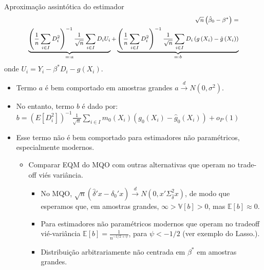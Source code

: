 \documentclass[11pt]{beamer}
\begin{document}
	\begin{frame}{Aproximação assintótica do estimador}
		\begin{equation*}
			\footnotesize 
			\begin{aligned}
						\sqrt{n}\left(\hat{\beta}_{0}-\beta^*\right)=\\ \underbrace{\left(\frac{1}{n} \sum_{i \in I} D_{i}^{2}\right)^{-1} \frac{1}{\sqrt{n}} \sum_{i \in I} D_{i} U_{i}}_{=:a}+\underbrace{\left(\frac{1}{n} \sum_{i \in I} D_{i}^{2}\right)^{-1} \frac{1}{\sqrt{n}} \sum_{i \in I} D_{i}\left(g\left(X_{i}\right)-\hat{g}\left(X_{i}\right)\right)}_{=:b}
			\end{aligned}
		\end{equation*}
						onde $U_i = Y_i - \beta^* D_i - g(X_i)$.

		\begin{itemize}
			\item Termo $a$ é bem comportado em amostras grandes $a\overset{d}{\to} N(0,\sigma^2)$.
			\item No entanto, termo $b$ é dado por:
			\(b=\left(E\left[D_{i}^{2}\right]\right)^{-1} \frac{1}{\sqrt{n}} \sum_{i \in I} m_{0}\left(X_{i}\right)\left(g_{0}\left(X_{i}\right)-\hat{g}_{0}\left(X_{i}\right)\right)+o_{P}(1)\)
			\item Esse termo não é bem comportado para estimadores não paramétricos, especialmente modernos.
			\begin{itemize}
				\item Comparar EQM do MQO com outras alternativas que operam no trade-off viés variância.
				\begin{itemize}
				\item No MQO, $\sqrt{n}(\hat{\delta}'x - \delta_0'x) \overset{d}{\to}N(0, x'\Sigma^2_{\hat{\delta}}x)$, de modo que esperamos que, em amostras grandes, $\infty>\mathbb{V}[b] > 0$, mas $\mathbb{E}[b]\approx 0$.
				\item Para estimadores não paramétricos modernos que operam no tradeoff vié-variância $\mathbb{E}[b] = \frac{1}{n^{-1/2 + \psi}}$, para $\psi < -1/2$ (ver exemplo do Lasso.). 
				\item Distribuição arbitrariamente não centrada em $\beta^*$ em amostras grandes.
				 \end{itemize}
			\end{itemize}
		\end{itemize}
	\end{frame}
	
\end{document}
